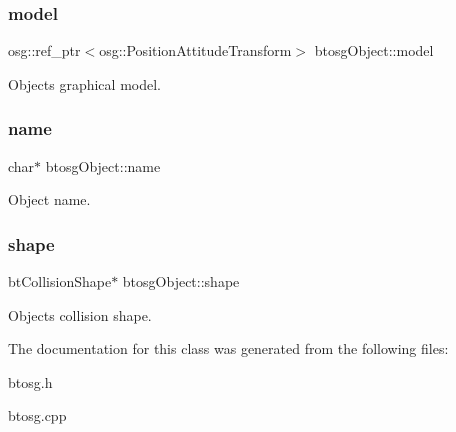 \mbox{\label{classbtosgObject_afd15726e7a214212d6d5815f8ac1ac6c}} 
\subsubsection{\texorpdfstring{model}{model}}
{\footnotesize\ttfamily osg\+::ref\+\_\+ptr$<$osg\+::\+Position\+Attitude\+Transform$>$ btosg\+Object\+::model}



Object\textquotesingle{}s graphical model. 

\mbox{\label{classbtosgObject_a12396e1362797a75473a2e833b579cc9}} 
\subsubsection{\texorpdfstring{name}{name}}
{\footnotesize\ttfamily char$\ast$ btosg\+Object\+::name}



Object name. 

\mbox{\label{classbtosgObject_a0f6a8da01cf643c321bffe86e42604b0}} 
\subsubsection{\texorpdfstring{shape}{shape}}
{\footnotesize\ttfamily bt\+Collision\+Shape$\ast$ btosg\+Object\+::shape}



Object\textquotesingle{}s collision shape. 



The documentation for this class was generated from the following files\+:\begin{DoxyCompactItemize}
\item 
btosg.\+h\item 
btosg.\+cpp\end{DoxyCompactItemize}
